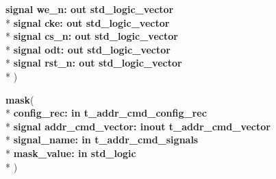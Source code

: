 \begin{DoxyCompactItemize}
  {\bfseries \textcolor{keywordflow}{signal }\textcolor{vhdlchar}{we\+\_\+n\+: }\textcolor{stringliteral}{} {\bfseries \textcolor{keywordflow}{out}\textcolor{vhdlchar}{ }\textcolor{comment}{std\+\_\+logic\+\_\+vector}\textcolor{vhdlchar}{ }}}\\*
  {\bfseries \textcolor{keywordflow}{signal }\textcolor{vhdlchar}{cke\+: }\textcolor{stringliteral}{} {\bfseries \textcolor{keywordflow}{out}\textcolor{vhdlchar}{ }\textcolor{comment}{std\+\_\+logic\+\_\+vector}\textcolor{vhdlchar}{ }}}\\*
  {\bfseries \textcolor{keywordflow}{signal }\textcolor{vhdlchar}{cs\+\_\+n\+: }\textcolor{stringliteral}{} {\bfseries \textcolor{keywordflow}{out}\textcolor{vhdlchar}{ }\textcolor{comment}{std\+\_\+logic\+\_\+vector}\textcolor{vhdlchar}{ }}}\\*
  {\bfseries \textcolor{keywordflow}{signal }\textcolor{vhdlchar}{odt\+: }\textcolor{stringliteral}{} {\bfseries \textcolor{keywordflow}{out}\textcolor{vhdlchar}{ }\textcolor{comment}{std\+\_\+logic\+\_\+vector}\textcolor{vhdlchar}{ }}}\\*
  {\bfseries \textcolor{keywordflow}{signal }\textcolor{vhdlchar}{rst\+\_\+n\+: }\textcolor{stringliteral}{} {\bfseries \textcolor{keywordflow}{out}\textcolor{vhdlchar}{ }\textcolor{comment}{std\+\_\+logic\+\_\+vector}\textcolor{vhdlchar}{ }}}\\*
   )
\item 
{\bfseries {\bfseries \textcolor{vhdlchar}{ }}} {\bf mask}( \\*
{\bfseries \textcolor{vhdlchar}{ }\textcolor{vhdlchar}{config\+\_\+rec\+: }\textcolor{stringliteral}{} {\bfseries \textcolor{keywordflow}{in}\textcolor{vhdlchar}{ }\textcolor{vhdlchar}{t\+\_\+addr\+\_\+cmd\+\_\+config\+\_\+rec}\textcolor{vhdlchar}{ }}}\\*
  {\bfseries \textcolor{keywordflow}{signal }\textcolor{vhdlchar}{addr\+\_\+cmd\+\_\+vector\+: }\textcolor{stringliteral}{} {\bfseries \textcolor{keywordflow}{inout}\textcolor{vhdlchar}{ }\textcolor{vhdlchar}{t\+\_\+addr\+\_\+cmd\+\_\+vector}\textcolor{vhdlchar}{ }}}\\*
  {\bfseries \textcolor{vhdlchar}{ }\textcolor{vhdlchar}{signal\+\_\+name\+: }\textcolor{stringliteral}{} {\bfseries \textcolor{keywordflow}{in}\textcolor{vhdlchar}{ }\textcolor{vhdlchar}{t\+\_\+addr\+\_\+cmd\+\_\+signals}\textcolor{vhdlchar}{ }}}\\*
  {\bfseries \textcolor{vhdlchar}{ }\textcolor{vhdlchar}{mask\+\_\+value\+: }\textcolor{stringliteral}{} {\bfseries \textcolor{keywordflow}{in}\textcolor{vhdlchar}{ }\textcolor{comment}{std\+\_\+logic}\textcolor{vhdlchar}{ }}}\\*
   )
\end{DoxyCompactItemize}


